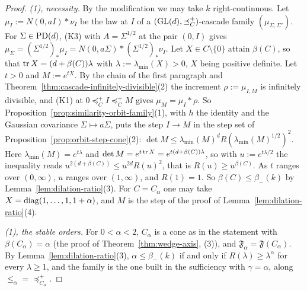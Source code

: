 \begin{proof}
\emph{(1), necessity.} By the modification we may take $k$ right-continuous. Let $\mu_I := N(0, aI) * \nu_I$ be the law at $I$ of a $(\mathrm{GL}(d), \preceq^+_C)$-cascade
family $(\mu_{\Sigma,\Sigma'})$. For $\Sigma \in \mathrm{PD}(d)$, (K3) with $A = \Sigma^{1/2}$ at the pair $(0, I)$ gives
$\mu_\Sigma = (\Sigma^{1/2})_*\mu_I = N(0, a\Sigma) * (\Sigma^{1/2})_*\nu_I$. Let $X \in C \setminus \{0\}$ attain
$\beta(C)$, so that $\operatorname{tr} X = (d + \beta(C))\lambda$ with $\lambda := \lambda_{\min}(X) > 0$, $X$ being positive definite. Let $t > 0$ and $M := e^{tX}$. By the chain of the first paragraph and
Theorem~\ref{thm:cascade-infinitely-divisible}(2) the increment $\rho := \mu_{I,M}$ is infinitely divisible, and (K1) at
$0 \preceq^+_C I \preceq^+_C M$ gives $\mu_M = \mu_I * \rho$. So Proposition~\ref{prop:similarity-orbit-family}(1), with $h$ the
identity and the Gaussian covariance $\Sigma \mapsto a\Sigma$, puts the step $I \to M$ in the step set of
Proposition~\ref{prop:orbit-step-cone}(2): $\det M \le \lambda_{\min}(M)^dR(\lambda_{\min}(M)^{1/2})^2$. Here
$\lambda_{\min}(M) = e^{t\lambda}$ and $\det M = e^{t\operatorname{tr} X} = e^{t(d+\beta(C))\lambda}$, so with $u := e^{t\lambda/2}$ the
inequality reads $u^{2(d+\beta(C))} \le u^{2d}R(u)^2$, that is $R(u) \ge u^{\beta(C)}$. As $t$ ranges over
$(0, \infty)$, $u$ ranges over $(1, \infty)$, and $R(1) = 1$. So $\beta(C) \le \beta_-(k)$ by
Lemma~\ref{lem:dilation-ratio}(3). For $C = C_\alpha$ one may take $X = \operatorname{diag}(1, \dots, 1, 1 + \alpha)$, and $M$ is the
step of the proof of Lemma~\ref{lem:dilation-ratio}(4).

\emph{(1), the stable orders.} For $0 < \alpha < 2$, $C_\alpha$ is a cone as in the statement with
$\beta(C_\alpha) = \alpha$ (the proof of Theorem~\ref{thm:wedge-axis}, (3)), and $\mathfrak F_\alpha = \mathfrak F(C_\alpha)$. By
Lemma~\ref{lem:dilation-ratio}(3), $\alpha \le \beta_-(k)$ if and only if $R(\lambda) \ge \lambda^\alpha$ for every
$\lambda \ge 1$, and the family is the one built in the sufficiency with $\gamma = \alpha$, along
$\le_\alpha = \preceq^+_{C_\alpha}$.


\end{proof}
